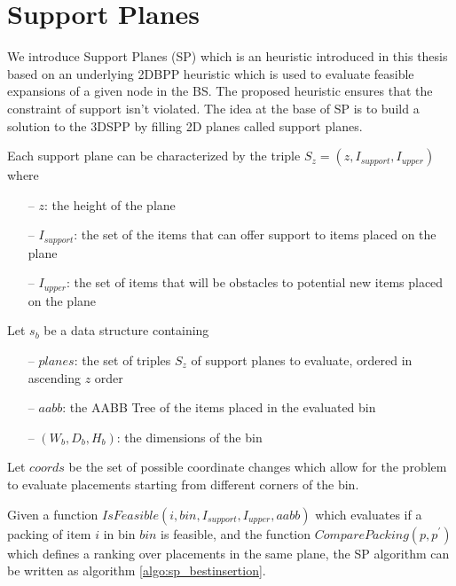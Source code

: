 \section{Support Planes}
\label{sec:support_planes}%
We introduce Support Planes (SP) which is an heuristic introduced in this thesis based on an underlying 2DBPP heuristic which is used to evaluate feasible expansions of a given node in the BS.
The proposed heuristic ensures that the constraint of support isn't violated.
The idea at the base of SP is to build a solution to the 3DSPP by filling 2D planes called support planes.

Each support plane can be characterized by the triple $S_z = (z, I_{support}, I_{upper})$ where
\begin{itemize}
    \item[--] $z$: the height of the plane 
    \item[--] $I_{support}$: the set of the items that can offer support to items placed on the plane
    \item[--] $I_{upper}$: the set of items that will be obstacles to potential new items placed on the plane %
\end{itemize}%

Let $s_b$ be a data structure containing
\begin{itemize}
    \item[--] $planes$: the set of triples $S_z$ of support planes to evaluate, ordered in ascending $z$ order
    \item[--] $aabb$: the AABB Tree of the items placed in the evaluated bin
    \item[--] $(W_{b}, D_{b}, H_{b})$: the dimensions of the bin
\end{itemize}

Let $coords$ be the set of possible coordinate changes which allow for the problem to evaluate placements starting from different corners of the bin. %

Given a function $IsFeasible(i, bin, I_{support}, I_{upper}, aabb)$ which evaluates if a packing of item $i$ in bin $bin$ is feasible,
and the function $ComparePacking(p, p^\prime)$ which defines a ranking over placements in the same plane,
the SP algorithm can be written as algorithm \ref{algo:sp_bestinsertion}.




